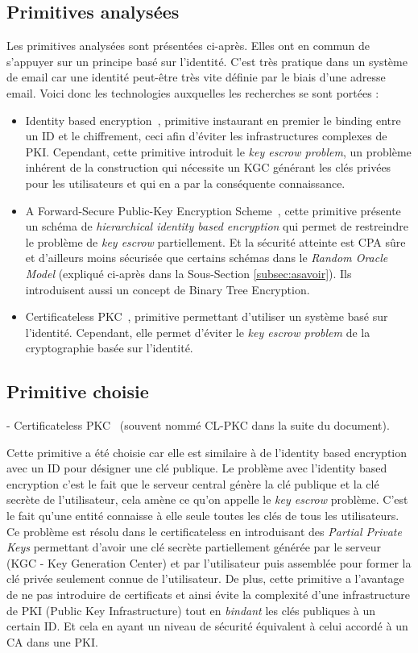 \subsection{Primitives analysées}
Les primitives analysées sont présentées ci-après. Elles ont en commun de s'appuyer sur un principe basé sur l'identité. C'est très pratique dans un système de email car une identité peut-être très vite définie par le biais d'une adresse email. Voici donc les technologies auxquelles les recherches se sont portées :
\begin{itemize}
	\item Identity based encryption~\cite{conf/crypto/Shamir84}, primitive instaurant en premier le binding entre un ID et le chiffrement, ceci afin d'éviter les infrastructures complexes de PKI. Cependant, cette primitive introduit le \textit{key escrow problem}, un problème inhérent de la construction qui nécessite un KGC générant les clés privées pour les utilisateurs et qui en a par la conséquente connaissance.
	\item A Forward-Secure Public-Key Encryption Scheme~\cite{conf/eurocrypt/CanettiHK03}, cette primitive présente un schéma de \textit{hierarchical identity based encryption} qui permet de restreindre le problème de \textit{key escrow} partiellement. Et la sécurité atteinte est CPA sûre et d'ailleurs moins sécurisée que certains schémas dans le \textit{Random Oracle Model} (expliqué ci-après dans la Sous-Section \ref{subsec:asavoir}). Ils introduisent aussi un concept de Binary Tree Encryption.
	\item Certificateless PKC~\cite{conf/asiacrypt/Al-RiyamiP03}, primitive permettant d'utiliser un système basé sur l'identité. Cependant, elle permet d'éviter le \textit{key escrow problem} de la cryptographie basée sur l'identité.
\end{itemize}
\subsection{Primitive choisie}
- Certificateless PKC~\cite{conf/asiacrypt/Al-RiyamiP03} (souvent nommé CL-PKC dans la suite du document).

 Cette primitive a été choisie car elle est similaire à de l'identity based encryption avec un ID pour désigner une clé publique. Le problème avec l'identity based encryption c'est le fait que le serveur central génère la clé publique et la clé secrète de l'utilisateur, cela amène ce qu'on appelle le \textit{key escrow} problème. C'est le fait qu'une entité connaisse à elle seule toutes les clés de tous les utilisateurs. Ce problème est résolu dans le certificateless en introduisant des \textit{Partial Private Keys} permettant d'avoir une clé secrète partiellement générée par le serveur (KGC - Key Generation Center) et par l'utilisateur puis assemblée pour former la clé privée seulement connue de l'utilisateur. De plus, cette primitive a l'avantage de ne pas introduire de certificats et ainsi évite la complexité d'une infrastructure de PKI (Public Key Infrastructure) tout en \textit{bindant} les clés publiques à un certain ID. Et cela en ayant un niveau de sécurité équivalent à celui accordé à un CA dans une PKI.

